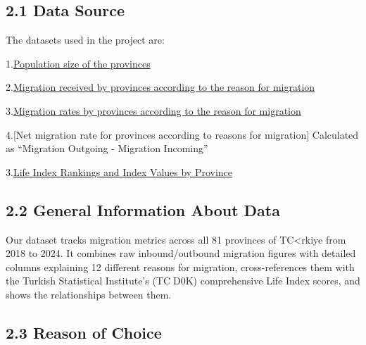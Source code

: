\documentclass[
  11pt,
  a4paper,
  DIV=11,
  numbers=noendperiod]{scrartcl}
\begin{document}
\subsection{2.1 Data Source}\label{data-source}

The datasets used in the project are:

1.\href{https://veriportali.tuik.gov.tr/api/tr/data/downloads?t=i&p=btt\%2FI0Npd\%2BLvtOvCSZRIUZxbvXE3lIAf5bE6X3CdLQJxPknvezk\%2BE6i3Md3GTPYHYMhzGdG2vbYkzOXomic6rY8F\%2FyL8NGud1ChYCxoEgy5FkIT\%2BMezMLoMVyKJUHwSgAQ\%2BDeuZaUgEdXmyanOwSEQ\%3D\%3D}{Population
size of the provinces}

2.\href{https://veriportali.tuik.gov.tr/api/tr/data/downloads?t=i&p=\%2FMyiBh3DmS\%2Bv\%2BBjCf9\%2BzPq\%2B96lw8HZTF50uTl9jqBks\%2BK5WE6sQNt\%2Fqka0J5\%2BImWGTGxKxiPcrz7kNG6I3rKkrLi\%2B8mZkMkz9reke8\%2BHd\%2Fo\%3D}{Migration
received by provinces according to the reason for migration}

3.\href{https://veriportali.tuik.gov.tr/api/tr/data/downloads?t=i&p=\%2FMyiBh3DmS\%2Bv\%2BBjCf9\%2BzPq\%2B96lw8HZTF50uTl9jqBks\%2BK5WE6sQNt\%2Fqka0J5\%2BImWGTGxKxiPcrz7kNG6I3rKkrLi\%2B8mZkMkz9reke8\%2BHd\%2Fo\%3D}{Migration
rates by provinces according to the reason for migration}

4.{[}Net migration rate for provinces according to reasons for
migration{]} Calculated as ``Migration Outgoing - Migration Incoming''

3.\href{https://veriportali.tuik.gov.tr/api/tr/data/downloads?t=i&p=5IS1p1Z\%2Btvlc0qxFhZzbC9g6NOWXugwdILs8mAMegx5w5sIpUqxydG6\%2B5\%2FWn1HGIIXJVqd\%2Fwn\%2B78duD2fsK84VEREA5Sn4QY5oeOWRHZRvVYOaDudiOCwll9hFpmp5W}{Life
Index Rankings and Index Values by Province}

\subsection{2.2 General Information About
Data}\label{general-information-about-data}

Our dataset tracks migration metrics across all 81 provinces of
TC\textless rkiye from 2018 to 2024. It combines raw inbound/outbound
migration figures with detailed columns explaining 12 different reasons
for migration, cross-references them with the Turkish Statistical
Institute's (TCD0K) comprehensive Life Index scores, and shows the
relationships between them.

\subsection{2.3 Reason of Choice}\label{reason-of-choice}
\end{document}
